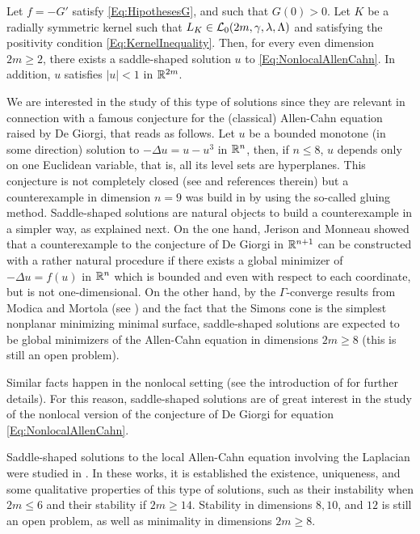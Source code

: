 \begin{theorem}
	\label{Th:Existence}
    Let $f=-G'$ satisfy \eqref{Eq:HipothesesG}, and such that $G(0)>0$. Let $K$ be a radially symmetric kernel such that $L_K\in \mathcal{L}_0(2m, \gamma, \lambda, \Lambda)$ and satisfying the positivity condition \eqref{Eq:KernelInequality}. Then, for every even dimension $2m \geq 2$, there exists a saddle-shaped solution $u$ to \eqref{Eq:NonlocalAllenCahn}. In addition, $u$ satisfies $|u|<1$ in $\mathbb{R}^{2m}$.
\end{theorem}

We are interested in the study of this type of solutions since they are relevant in connection with a famous conjecture for the (classical) Allen-Cahn equation raised by De Giorgi, that reads as follows. Let $u$ be a bounded monotone (in some direction) solution to $-\Delta u = u - u^3$ in $\mathbb{R}^n$, then, if $n \leq 8$, $u$ depends only on one Euclidean variable, that is, all its level sets are hyperplanes. This conjecture is not completely closed (see \cite{FarinaValdinoci-DeGiorgi} and references therein) but a counterexample in dimension $n=9$ was build in \cite{delPinoKowalczykWei} by using the so-called gluing method. Saddle-shaped solutions are natural objects to build a counterexample in a simpler way, as explained next. On the one hand, Jerison and Monneau \cite{JerisonMonneau} showed that a counterexample to the conjecture of De Giorgi in $\mathbb{R}^{n+1}$ can be constructed with a rather natural procedure if there exists a global minimizer of $-\Delta u = f(u)$ in $\mathbb{R}^n$ which is bounded and even with respect to each coordinate, but is not one-dimensional. On the other hand, by the $\Gamma$-converge results from Modica and Mortola (see \cite{Modica,ModicaMortola}) and the fact that the Simons cone is the simplest nonplanar minimizing minimal surface, saddle-shaped solutions are expected to be global minimizers of the Allen-Cahn equation in dimensions $2m\geq 8$ (this is still an open problem).

Similar facts happen in the nonlocal setting (see the introduction of \cite{Felipe-Sanz-Perela:SaddleFractional} for further details). For this reason, saddle-shaped solutions are of great interest in the study of the nonlocal version of the conjecture of De Giorgi for equation \eqref{Eq:NonlocalAllenCahn}.

Saddle-shaped solutions to the local Allen-Cahn equation involving the Laplacian were studied in \cite{DangFifePeletier, Schatzman, CabreTerraI,CabreTerraII, Cabre-Saddle}. In these works, it is established the existence, uniqueness, and some qualitative properties of this type of solutions, such as their instability when $2m\leq 6$ and their stability if $2m\geq 14$. Stability in dimensions $8, 10$, and $12$ is still an open problem, as well as minimality in dimensions $2m\geq 8$.

